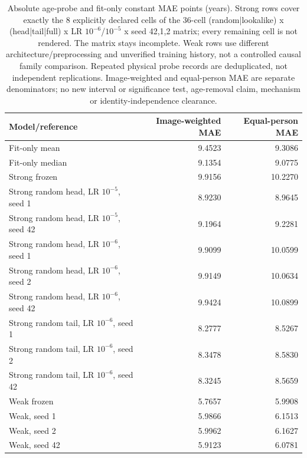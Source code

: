 \begin{table}[!t]
\caption{Absolute age-probe and fit-only constant MAE points (years). Strong rows cover exactly the 8 explicitly declared cells of the 36-cell (random|lookalike) x (head|tail|full) x LR $10^{-6}$/$10^{-5}$ x seed {42,1,2} matrix; every remaining cell is not rendered. The matrix stays incomplete. Weak rows use different architecture/preprocessing and unverified training history, not a controlled causal family comparison. Repeated physical probe records are deduplicated, not independent replications. Image-weighted and equal-person MAE are separate denominators; no new interval or significance test, age-removal claim, mechanism or identity-independence clearance.}
\label{tab:age-probe-absolute-points}
\centering\scriptsize
\begin{tabular}{@{}lrr@{}}
\toprule
Model/reference & Image-weighted MAE & Equal-person MAE \\
\midrule
Fit-only mean & 9.4523 & 9.3086 \\
Fit-only median & 9.1354 & 9.0775 \\
Strong frozen & 9.9156 & 10.2270 \\
Strong random head, LR $10^{-5}$, seed 1 & 8.9230 & 8.9645 \\
Strong random head, LR $10^{-5}$, seed 42 & 9.1964 & 9.2281 \\
Strong random head, LR $10^{-6}$, seed 1 & 9.9099 & 10.0599 \\
Strong random head, LR $10^{-6}$, seed 2 & 9.9149 & 10.0634 \\
Strong random head, LR $10^{-6}$, seed 42 & 9.9424 & 10.0899 \\
Strong random tail, LR $10^{-6}$, seed 1 & 8.2777 & 8.5267 \\
Strong random tail, LR $10^{-6}$, seed 2 & 8.3478 & 8.5830 \\
Strong random tail, LR $10^{-6}$, seed 42 & 8.3245 & 8.5659 \\
Weak frozen & 5.7657 & 5.9908 \\
Weak, seed 1 & 5.9866 & 6.1513 \\
Weak, seed 2 & 5.9962 & 6.1627 \\
Weak, seed 42 & 5.9123 & 6.0781 \\
\bottomrule
\end{tabular}
\end{table}
